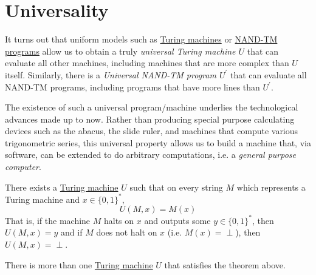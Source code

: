 \section{Universality}

  It turns out that uniform models such as \hyperref[def:turing-machine]{Turing machines} or \hyperref[def:nand-tm-programs]{NAND-TM programs} allow us to obtain a truly \textit{universal Turing machine $U$} that can evaluate all other machines, including machines that are more complex than $U$ itself. Similarly, there is a \textit{Universal NAND-TM program $U^\prime$} that can evaluate all NAND-TM programs, including programs that have more lines than $U^\prime$. 

  The existence of such a universal program/machine underlies the technological advances made up to now. Rather than producing special purpose calculating devices such as the abacus, the slide ruler, and machines that compute various trigonometric series, this universal property allows us to build a machine that, via software, can be extended to do arbitrary computations, i.e. a \textit{general purpose computer}. 

  \begin{theorem}
    \label{thm:universal-turing-machine}
  There exists a \hyperref[def:turing-machine]{Turing machine} $U$ such that on every string $M$ which represents a Turing machine and $x \in \{0,1\}^*$, 
  \begin{equation}
    U(M, x) = M(x)
  \end{equation}
  That is, if the machine $M$ halts on $x$ and outputs some $y \in \{0,1\}^*$, then $U(M, x) = y$ and if $M$ does not halt on $x$ (i.e. $M(x) = \perp$), then $U(M, x) = \perp$. 
  \end{theorem}

  There is more than one \hyperref[def:turing-machine]{Turing machine} $U$ that satisfies the theorem above. 

